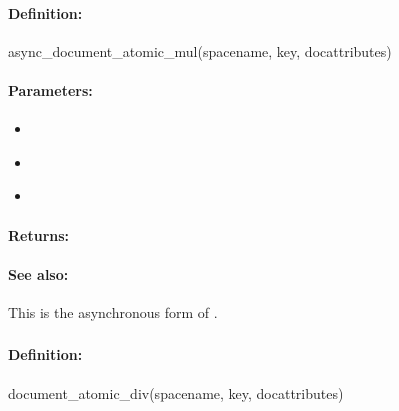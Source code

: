 \paragraph{Definition:}
\begin{rubycode}
async_document_atomic_mul(spacename, key, docattributes)
\end{rubycode}

\paragraph{Parameters:}
\begin{itemize}[noitemsep]
\item {}\\

\item {}\\

\item {}\\

\end{itemize}

\paragraph{Returns:}


\paragraph{See also:}  This is the asynchronous form of .

\pagebreak
\subsubsection{}
\label{api:ruby:document_atomic_div}


\paragraph{Definition:}
\begin{rubycode}
document_atomic_div(spacename, key, docattributes)
\end{rubycode}

